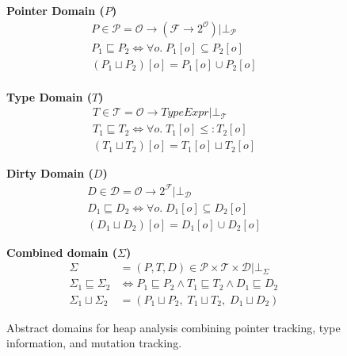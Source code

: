 \newcommand{\defeq}{\overset{\text{\tiny def}}{=}}

\begin{figure*}[t]
\centering

\begin{minipage}[t]{0.32\textwidth}
\centering
\textbf{Pointer Domain ($P$)}
\begin{gather*}
P \in \mathcal{P} = \mathcal{O} \to (\mathcal{F} \to 2^{\mathcal{O}}) | \bot_\mathcal{P} \\[0.3em]
P_1 \sqsubseteq P_2 \iff \forall o.\; P_1[o] \subseteq P_2[o] \\[0.3em]
(P_1 \sqcup P_2)[o] = P_1[o] \cup P_2[o] \\
\end{gather*}
\end{minipage}%
\hfill
\begin{minipage}[t]{0.32\textwidth}
\centering
\textbf{Type Domain ($T$)}
\begin{gather*}
T \in \mathcal{T} = \mathcal{O} \to \mathit{TypeExpr} | \bot_\mathcal{T} \\[0.3em]
T_1 \sqsubseteq T_2 \iff \forall o.\; T_1[o] \leq: T_2[o] \\[0.3em]
(T_1 \sqcup T_2)[o] = T_1[o] \sqcup T_2[o]
\end{gather*}
\end{minipage}%
\hfill
\begin{minipage}[t]{0.32\textwidth}
\centering
\textbf{Dirty Domain ($D$)}
\begin{gather*}
D \in \mathcal{D} = \mathcal{O} \to 2^{\mathcal{F}} | \bot_\mathcal{D} \\[0.3em]
D_1 \sqsubseteq D_2 \iff \forall o.\; D_1[o] \subseteq D_2[o] \\[0.3em]
(D_1 \sqcup D_2)[o] = D_1[o] \cup D_2[o]
\end{gather*}
\end{minipage}

\vspace{1.5em}

\noindent\textbf{Combined domain ($\Sigma$)}
\begin{align*}
\Sigma &= (P,T,D) \in \mathcal{P} \times \mathcal{T} \times \mathcal{D} | \bot_\Sigma\\[0.3em]
\Sigma_1 \sqsubseteq \Sigma_2 &\iff P_1 \sqsubseteq P_2 \land T_1 \sqsubseteq T_2 \land D_1 \sqsubseteq D_2 \\[0.3em]
\Sigma_1 \sqcup \Sigma_2 &= (P_1 \sqcup P_2,\; T_1 \sqcup T_2,\; D_1 \sqcup D_2)
\end{align*}

\caption{Abstract domains for heap analysis combining pointer tracking, type information, and mutation tracking.}
\label{fig:abstract-domains}
\end{figure*}

